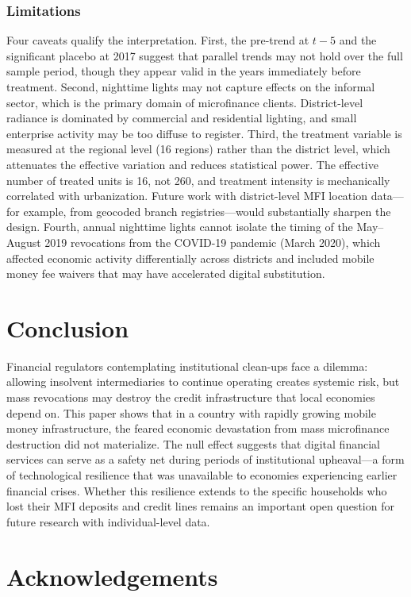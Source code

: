 \documentclass[12pt]{article}
\begin{document}
\subsubsection*{Limitations} Four caveats qualify the interpretation. First, the pre-trend at $t-5$ and the significant placebo at 2017 suggest that parallel trends may not hold over the full sample period, though they appear valid in the years immediately before treatment. Second, nighttime lights may not capture effects on the informal sector, which is the primary domain of microfinance clients. District-level radiance is dominated by commercial and residential lighting, and small enterprise activity may be too diffuse to register. Third, the treatment variable is measured at the regional level (16 regions) rather than the district level, which attenuates the effective variation and reduces statistical power. The effective number of treated units is 16, not 260, and treatment intensity is mechanically correlated with urbanization. Future work with district-level MFI location data---for example, from geocoded branch registries---would substantially sharpen the design. Fourth, annual nighttime lights cannot isolate the timing of the May--August 2019 revocations from the COVID-19 pandemic (March 2020), which affected economic activity differentially across districts and included mobile money fee waivers that may have accelerated digital substitution.

\section{Conclusion}

Financial regulators contemplating institutional clean-ups face a dilemma: allowing insolvent intermediaries to continue operating creates systemic risk, but mass revocations may destroy the credit infrastructure that local economies depend on. This paper shows that in a country with rapidly growing mobile money infrastructure, the feared economic devastation from mass microfinance destruction did not materialize. The null effect suggests that digital financial services can serve as a safety net during periods of institutional upheaval---a form of technological resilience that was unavailable to economies experiencing earlier financial crises. Whether this resilience extends to the specific households who lost their MFI deposits and credit lines remains an important open question for future research with individual-level data.

\section*{Acknowledgements}
\end{document}
